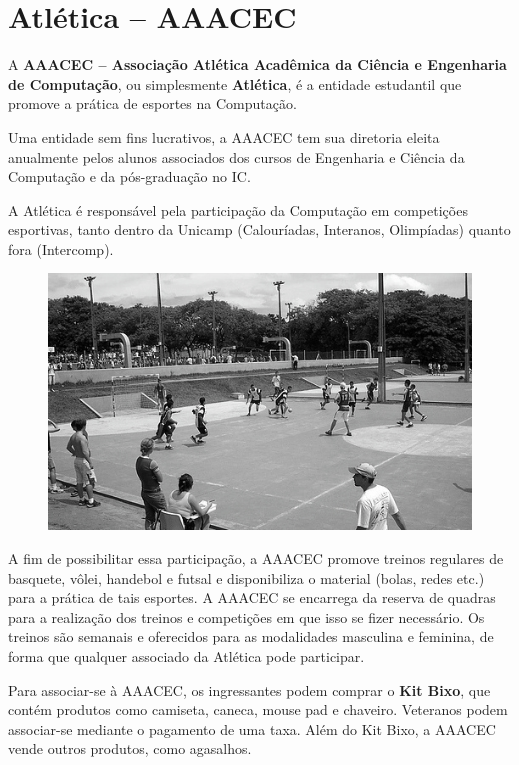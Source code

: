 
\section{Atlética -- AAACEC}

A \textbf{AAACEC -- Associação Atlética Acadêmica da Ciência e Engenharia de
Computação}, ou simplesmente \textbf{Atlética}, é a entidade estudantil que
promove a prática de esportes na Computação.

Uma entidade sem fins lucrativos, a AAACEC tem sua diretoria eleita anualmente
pelos alunos associados dos cursos de Engenharia e Ciência da Computação e da
pós-graduação no IC.

A Atlética é responsável pela participação da Computação em competições
esportivas, tanto dentro da Unicamp (Calouríadas, Interanos, Olimpíadas) quanto
fora (Intercomp).

\begin{figure}[H]
    \centering
    \includegraphics[scale=0.55]{img/alem_da_graduacao/aaacec_foto.jpg}
\end{figure}

A fim de possibilitar essa participação, a AAACEC promove treinos regulares de
basquete, vôlei, handebol e futsal e disponibiliza o material (bolas, redes
etc.) para a prática de tais esportes. A AAACEC se encarrega da reserva de
quadras para a realização dos treinos e competições em que isso se fizer
necessário. Os treinos são semanais e oferecidos para as modalidades masculina e
feminina, de forma que qualquer associado da Atlética pode participar.

Para associar-se à AAACEC, os ingressantes podem comprar o \textbf{Kit Bixo},
que contém produtos como camiseta, caneca, mouse pad e chaveiro. Veteranos podem
associar-se mediante o pagamento de uma taxa. Além do Kit Bixo, a AAACEC vende
outros produtos, como agasalhos.

